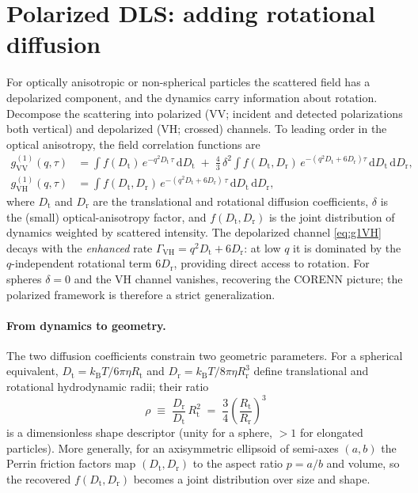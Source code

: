 \documentclass[11pt]{article}
\newcommand{\g}[1]{g^{(#1)}}
\newcommand{\rd}{\,\mathrm{d}}
\newcommand{\kB}{k_{\mathrm B}}
\newcommand{\Dt}{D_{\mathrm t}}
\newcommand{\Dr}{D_{\mathrm r}}
\begin{document}
\section{Polarized DLS: adding rotational diffusion}
\label{sec:polarized}
For optically anisotropic or non-spherical particles the scattered field has a
depolarized component, and the dynamics carry information about rotation.
Decompose the scattering into polarized (VV; incident and detected
polarizations both vertical) and depolarized (VH; crossed) channels. To leading
order in the optical anisotropy, the field correlation functions are
\begin{align}
  \g1_{\mathrm{VV}}(q,\tau)
    &= \int f(\Dt)\,e^{-q^2 \Dt\,\tau}\rd\Dt
       \;+\; \tfrac{4}{3}\,\delta^2\!\!\int f(\Dt,\Dr)\,
       e^{-(q^2\Dt + 6\Dr)\tau}\rd\Dt\rd\Dr ,
       \label{eq:g1VV}\\[2pt]
  \g1_{\mathrm{VH}}(q,\tau)
    &= \int f(\Dt,\Dr)\,e^{-(q^2\Dt + 6\Dr)\,\tau}\rd\Dt\rd\Dr ,
       \label{eq:g1VH}
\end{align}
where $\Dt$ and $\Dr$ are the translational and rotational diffusion
coefficients, $\delta$ is the (small) optical-anisotropy factor, and
$f(\Dt,\Dr)$ is the joint distribution of dynamics weighted by scattered
intensity. The depolarized channel \eqref{eq:g1VH} decays with the
\emph{enhanced} rate $\Gamma_{\mathrm{VH}} = q^2\Dt + 6\Dr$: at low $q$ it is
dominated by the $q$-independent rotational term $6\Dr$, providing direct access
to rotation. For spheres $\delta = 0$ and the VH channel vanishes, recovering
the CORENN picture; the polarized framework is therefore a strict generalization.

\paragraph{From dynamics to geometry.}
The two diffusion coefficients constrain two geometric parameters. For a
spherical equivalent, $\Dt = \kB T/6\pi\eta R_{\mathrm t}$ and
$\Dr = \kB T/8\pi\eta R_{\mathrm r}^3$ define translational and rotational
hydrodynamic radii; their ratio
\begin{equation}
  \rho \;\equiv\; \frac{\Dr}{\Dt}\,R_{\mathrm t}^2
  \;=\; \frac{3}{4}\left(\frac{R_{\mathrm t}}{R_{\mathrm r}}\right)^{\!3}
\end{equation}
is a dimensionless shape descriptor (unity for a sphere, $>1$ for elongated
particles). More generally, for an axisymmetric ellipsoid of semi-axes $(a,b)$
the Perrin friction factors map $(\Dt,\Dr)$ to the aspect ratio $p=a/b$ and
volume, so the recovered $f(\Dt,\Dr)$ becomes a joint distribution over size and
shape.
\end{document}
